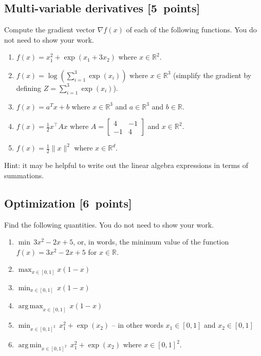 \documentclass{article}
\newcommand{\blu}[1]{{\textcolor{blu}{#1}}}
\let\ask\blu
\newcommand\pts[1]{\textcolor{pointscolour}{[#1~points]}}
\def\R{\mathbb{R}}
\DeclareMathOperator*{\argmax}{arg\,max}
\DeclareMathOperator*{\argmin}{arg\,min}
\newcommand{\norm}[1]{\lVert #1 \rVert}
\begin{document}
  \subsection{Multi-variable derivatives \pts{5}}
  \label{sub.multi.var}

  \ask{Compute the gradient vector $\nabla f(x)$ of each of the following functions.} You do not need to show your work.
  \begin{enumerate}
  \item $f(x) = x_1^2 + \exp(x_1 + 3x_2)$ where $x \in \R^2$.
  \item $f(x) = \log\left(\sum_{i=1}^3\exp(x_i)\right)$ where $x \in \R^3$ (simplify the gradient by defining $Z = \sum_{i=1}^3\exp(x_i)$).
  \item $f(x) = a^Tx + b$ where $x \in \R^3$ and $a \in \R^3$ and $b \in \R$.
  \item $f(x) = \frac12 x^\top A x$ where $A=\left[ \begin{array}{cc}
  4 & -1 \\
  -1 & 4 \end{array} \right]$ and $x \in \mathbb{R}^2$.
  \item $f(x) = \frac{1}{2}\norm{x}^2$ where $x \in \R^d$.
  \end{enumerate}

  Hint: it may be helpful to write out the linear algebra expressions in terms of summations.


  \subsection{Optimization \pts{6}}

  \ask{Find the following quantities.} You do not need to show your work.


  \begin{enumerate}
  \item $\min \, 3x^2-2x+5$, or, in words, the minimum value of the function $f(x) = 3x^2 -2x + 5$ for $x \in \R$.
  \item $\max_{x \in [0, 1]} x(1-x)$
  \item $\min_{x \in [0, 1]} \, x(1-x)$
  \item $\argmax_{x \in [0,1]} \, x(1-x)$
  \item $\min_{x \in [0, 1]^2} \, x_1^2 + \exp(x_2)$ -- in other words $x_1\in [0,1]$ and $x_2\in [0,1]$
  \item $\argmin_{x \in [0,1]^2} \, x_1^2 + \exp(x_2)$ where $x \in [0,1]^2$.
  \end{enumerate}
\end{document}
